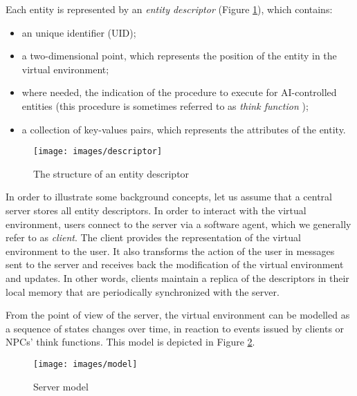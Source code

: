 \documentclass[final,10pt,a5paper]{phdimt}
\theoremstyle{definition}
\begin{document}
Each entity is represented by an \textit{entity descriptor} (Figure \ref{fig:descriptor}), which contains:
\begin{itemize}
\item an unique identifier (UID);
\item a two-dimensional point, which represents the position of the entity in the virtual environment;
\item where needed, the indication of the procedure to execute for AI-controlled entities (this procedure is sometimes referred to as \textit{think function} \cite{Bharambea});
\item a collection of key-values pairs, which represents the attributes of the entity.
\end{itemize}

\begin{figure}
\centering
\texttt{[image: images/descriptor]}
\caption{The structure of an entity descriptor}\label{fig:descriptor}
\end{figure}



In order to illustrate some background concepts, let us assume that a central server stores all entity descriptors.
In order to interact with the virtual environment, users connect to the server via a software agent, which we generally refer to as \textit{client}.
The client provides the representation of the virtual environment to the user. It also transforms the action of the user in  messages sent to the server and receives back the modification of the virtual environment and updates. In other words, clients maintain a replica of the descriptors in their local memory that are periodically synchronized with the server.

From the point of view of the server, the virtual environment can be modelled as a sequence of states changes over time, in reaction to events issued by clients or NPCs' think functions. This model is depicted in Figure \ref{fig:server-model}.

\begin{figure}[tbh]
\centering
\texttt{[image: images/model]}
\caption{Server model}\label{fig:server-model}
\end{figure}
\end{document}
